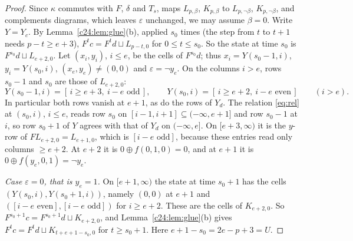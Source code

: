 \begin{proof}
Since $\kappa$ commutes with $F$, $\delta$ and $T_s$, maps $L_{p,\beta}$, $K_{p,\beta}$ to $L_{p,\neg\beta}$, $K_{p,\neg\beta}$, and complements diagrams, which leaves $\varepsilon$ unchanged, we may assume $\beta=0$. Write $Y=Y_c$. By Lemma~\ref{c24:lem:glue}(b), applied $s_0$ times (the step from $t$ to $t+1$ needs $p-t\ge e+3$), $F^tc=F^td\sqcup L_{p-t,0}$ for $0\le t\le s_0$. So the state at time $s_0$ is $F^{s_0}d\sqcup L_{e+2,0}$. Let $(x_i,y_i)$, $i\le e$, be the cells of $F^{s_0}d$; thus $x_i=Y(s_0-1,i)$, $y_i=Y(s_0,i)$, $(x_e,y_e)\ne(0,0)$ and $\varepsilon=\neg y_e$. On the columns $i>e$, rows $s_0-1$ and $s_0$ are those of $L_{e+2,0}$:
\[
Y(s_0-1,i)=[\,i\ge e+3,\ i-e\text{ odd}\,],\qquad Y(s_0,i)=[\,i\ge e+2,\ i-e\text{ even}\,]\qquad(i>e).
\]
In particular both rows vanish at $e+1$, as do the rows of $Y_d$. The relation \eqref{eq:rel} at $(s_0,i)$, $i\le e$, reads row $s_0$ on $[i-1,i+1]\subseteq(-\infty,e+1]$ and row $s_0-1$ at $i$, so row $s_0+1$ of $Y$ agrees with that of $Y_d$ on $(-\infty,e]$. On $[e+3,\infty)$ it is the $y$-row of $FL_{e+2,0}=L_{e+1,0}$, which is $[i-e\text{ odd}]$, because these entries read only columns $\ge e+2$. At $e+2$ it is $0\oplus f(0,1,0)=0$, and at $e+1$ it is $0\oplus f(y_e,0,1)=\neg y_e$.

\emph{Case $\varepsilon=0$, that is $y_e=1$.} On $[e+1,\infty)$ the state at time $s_0+1$ has the cells $(Y(s_0,i),Y(s_0+1,i))$, namely $(0,0)$ at $e+1$ and $([i-e\text{ even}],[i-e\text{ odd}])$ for $i\ge e+2$. These are the cells of $K_{e+2,0}$. So $F^{s_0+1}c=F^{s_0+1}d\sqcup K_{e+2,0}$, and Lemma~\ref{c24:lem:glue}(b) gives $F^tc=F^td\sqcup K_{t+e+1-s_0,0}$ for $t\ge s_0+1$. Here $e+1-s_0=2e-p+3=U$.


\end{proof}
